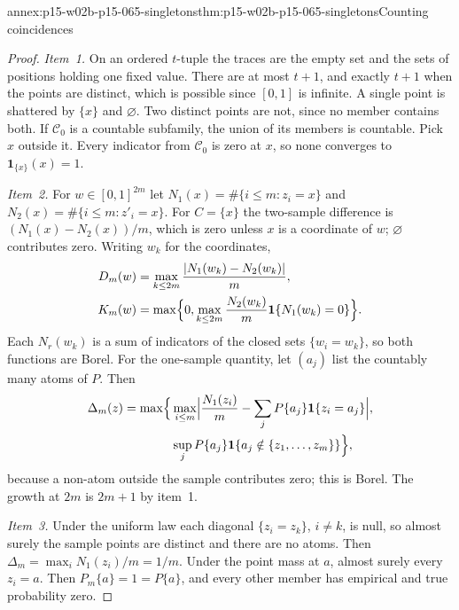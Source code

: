 \begin{annexitem}{annex:p15-w02b-p15-065-singletons}{thm:p15-w02b-p15-065-singletons}{Counting coincidences}
\begin{proof}
\emph{Item~1.} On an ordered \(t\)-tuple the traces are the empty set and
the sets of positions holding one fixed value. There are at most \(t+1\),
and exactly \(t+1\) when the points are distinct, which is possible since
\([0,1]\) is infinite. A single point is shattered by \(\{x\}\) and
\(\varnothing\). Two distinct points are not, since no member contains
both. If \(\mathcal C_0\) is a countable subfamily, the union of its members
is countable. Pick \(x\) outside it. Every indicator from \(\mathcal C_0\)
is zero at \(x\), so none converges to \(\mathbf1_{\{x\}}(x)=1\).

\emph{Item~2.} For \(w\in[0,1]^{2m}\) let
\(N_1(x)=\#\{i\leq m:z_i=x\}\) and \(N_2(x)=\#\{i\leq m:z'_i=x\}\). For
\(C=\{x\}\) the two-sample difference is \((N_1(x)-N_2(x))/m\), which is
zero unless \(x\) is a coordinate of \(w\); \(\varnothing\) contributes
zero. Writing \(w_k\) for the coordinates,
\begin{align*}
 D_m(w)&=\max_{k\leq2m}\frac{|N_1(w_k)-N_2(w_k)|}m,\\
 K_m(w)&=\max\Bigl\{0,\max_{k\leq2m}\frac{N_2(w_k)}m\mathbf1\{N_1(w_k)=0\}\Bigr\}.
\end{align*}
Each \(N_r(w_k)\) is a sum of indicators of the closed sets
\(\{w_i=w_k\}\), so both functions are Borel. For the one-sample quantity,
let \((a_j)\) list the countably many atoms of \(P\). Then
\begin{align*}
 \Delta_m(z)=\max\Bigl\{&\max_{i\leq m}\Bigl|\frac{N_1(z_i)}m-\sum_jP\{a_j\}\mathbf1\{z_i=a_j\}\Bigr|,\\
 &\sup_jP\{a_j\}\mathbf1\{a_j\notin\{z_1,\ldots,z_m\}\}\Bigr\},
\end{align*}
because a non-atom outside the sample contributes zero; this is Borel. The
growth at \(2m\) is \(2m+1\) by item~1.

\emph{Item~3.} Under the uniform law each diagonal \(\{z_i=z_k\}\),
\(i\ne k\), is null, so almost surely the sample points are distinct and
there are no atoms. Then \(\Delta_m=\max_iN_1(z_i)/m=1/m\). Under the point
mass at \(a\), almost surely every \(z_i=a\). Then \(P_m\{a\}=1=P\{a\}\),
and every other member has empirical and true probability zero.
\end{proof}
\end{annexitem}

